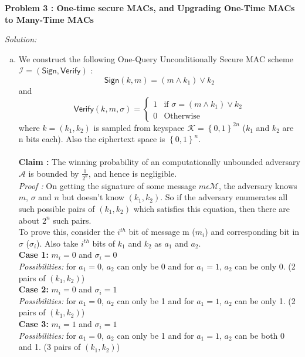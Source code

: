 \documentclass[a4paper, 11pt]{article}
\newenvironment{solution}
    {\textit{Solution:}}
    {\clearpage}
\newcommand{\prob}[1]{\begin{mdframed}[backgroundcolor=gray!20] \textbf{Problem #1}\end{mdframed}}
\newcommand{\bit}{\left\{0, 1\right\}}
\newcommand{\sign}{\mathsf{Sign}}
\newcommand{\verif}{\mathsf{Verify}}
\newcommand{\calA}{\mathcal{A}}
\newcommand{\calI}{\mathcal{I}}
\newcommand{\calK}{\mathcal{K}}
\newcommand{\calM}{\mathcal{M}}
\begin{document}
\prob{3 : One-time secure MACs, and Upgrading One-Time MACs to Many-Time MACs}
\begin{solution}
    \begin{enumerate}[(a)]
        \item We construct the following One-Query Unconditionally Secure MAC scheme $\calI = (\sign, \verif)$ :
              $$\sign(k, m) = (m \wedge k_1) \vee k_2$$ and
              $$\verif(k, m, \sigma) = \begin{cases}
                      1 & \text{if } \sigma =  (m \wedge k_1) \vee k_2 \\
                      0 & \text{Otherwise}
                  \end{cases}$$
              where $k = (k_1, k_2)$ is sampled from keyspace $\calK = \bit^{2n}$ ($k_1$ and $k_2$ are n bits each). Also the ciphertext space is $\bit^n$. \\ \\
              \textbf{Claim :} The winning probability of an computationally unbounded adversary $\calA$ is bounded by $\frac{1}{2^n}$, and hence is negligible. \\
              \textit{Proof :} On getting the signature of some message $m \epsilon \calM$, the adversary knows $m$, $\sigma$ and $n$ but doesn't know $(k_1, k_2)$. So if the adversary enumerates all such possible pairs of $(k_1, k_2)$ which satisfies this equation, then there are about $2^n$ such pairs. \\
              To prove this, consider the $i^{th}$ bit of message m ($m_i$) and corresponding bit in $\sigma$ ($\sigma_i$). Also take $i^{th}$ bits of $k_1$ and $k_2$ as $a_1$ and $a_2$. \\
              \textbf{Case 1:} $m_i = 0$ and $\sigma_i = 0$ \\
              \textit{Possibilities:} for $a_1 = 0$, $a_2$ can only be 0 and for $a_1 = 1$, $a_2$ can be only 0. (2 pairs of $(k_1, k_2)$)\\
              \textbf{Case 2:} $m_i = 0$ and $\sigma_i = 1$ \\
              \textit{Possibilities:} for $a_1 = 0$, $a_2$ can only be 1 and for $a_1 = 1$, $a_2$ can be only 1. (2 pairs of $(k_1, k_2)$)\\
              \textbf{Case 3:} $m_i = 1$ and $\sigma_i = 1$ \\
              \textit{Possibilities:} for $a_1 = 0$, $a_2$ can only be 1 and for $a_1 = 1$, $a_2$ can be both 0 and 1. (3 pairs of $(k_1, k_2)$)\\

\end{enumerate}
\end{solution}
\end{document}
